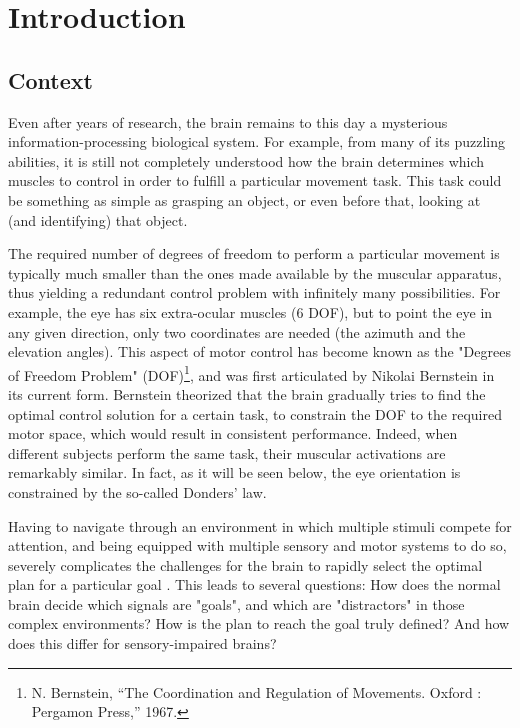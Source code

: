 
\chapter{Introduction}
\label{introduction}


\section{Context}
\label{cha1:context}
Even after years of research, the brain remains to this day a mysterious information-processing biological system. For example, from many of its puzzling abilities, it is still not completely understood how the brain determines which muscles to control in order to fulfill a particular movement task. This task could be something as simple as grasping an object, or even before that, looking at (and identifying) that  object.

The required number of degrees	 of freedom to perform a particular movement is typically much smaller than the ones made available by the muscular apparatus, thus yielding a redundant control problem with infinitely many possibilities. For example, the eye has six extra-ocular muscles (6 DOF), but to point the eye in any given direction, only two coordinates are needed (the azimuth and the elevation angles). This aspect of motor control has become known as the "Degrees of Freedom Problem" (DOF)\footnote{N. Bernstein, “The Coordination and Regulation of Movements. Oxford : Pergamon Press,” 1967.}, and was first articulated by Nikolai Bernstein in its current form. Bernstein theorized that the brain gradually tries to find the optimal control solution for a certain task, to constrain the DOF to the required motor space, which would result in consistent performance. Indeed, when different subjects perform the same task, their muscular activations are remarkably similar. In fact, as it will be seen below, the eye orientation is constrained by the so-called Donders' law.

Having to navigate through an environment in which multiple  stimuli compete for attention, and being equipped with multiple sensory and motor systems to do so, severely complicates the challenges for the brain to rapidly select the optimal plan for a particular goal \cite{johnpage}. This leads to several questions: How does the normal brain decide which signals are "goals", and which are "distractors" in those complex environments? How is the plan to reach the goal truly defined? And how does this differ for sensory-impaired brains? 

